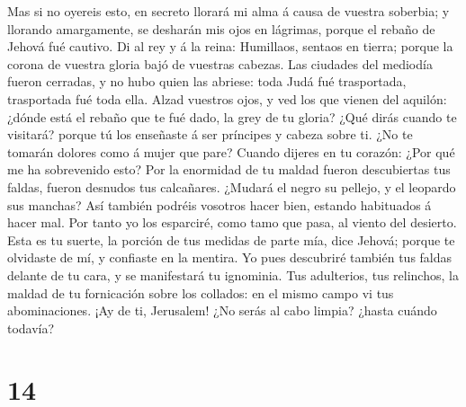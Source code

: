  Mas si no oyereis esto, en secreto llorará mi alma á
causa de vuestra soberbia; y llorando amargamente, se desharán mis ojos
en lágrimas, porque el rebaño de Jehová fué cautivo.  Di
al rey y á la reina: Humillaos, sentaos en tierra; porque la corona de
vuestra gloria bajó de vuestras cabezas.  Las ciudades
del mediodía fueron cerradas, y no hubo quien las abriese: toda Judá fué
trasportada, trasportada fué toda ella.  Alzad vuestros
ojos, y ved los que vienen del aquilón: ¿dónde está el rebaño que te fué
dado, la grey de tu gloria?  ¿Qué dirás cuando te
visitará? porque tú los enseñaste á ser príncipes y cabeza sobre ti. ¿No
te tomarán dolores como á mujer que pare?  Cuando dijeres
en tu corazón: ¿Por qué me ha sobrevenido esto? Por la enormidad de tu
maldad fueron descubiertas tus faldas, fueron desnudos tus calcañares.
 ¿Mudará el negro su pellejo, y el leopardo sus manchas?
Así también podréis vosotros hacer bien, estando habituados á hacer mal.
 Por tanto yo los esparciré, como tamo que pasa, al
viento del desierto.  Esta es tu suerte, la porción de
tus medidas de parte mía, dice Jehová; porque te olvidaste de mí, y
confiaste en la mentira.  Yo pues descubriré también tus
faldas delante de tu cara, y se manifestará tu ignominia.
 Tus adulterios, tus relinchos, la maldad de tu
fornicación sobre los collados: en el mismo campo vi tus abominaciones.
¡Ay de ti, Jerusalem! ¿No serás al cabo limpia? ¿hasta cuándo todavía?

\hypertarget{section-13}{%
\section{14}\label{section-13}}


